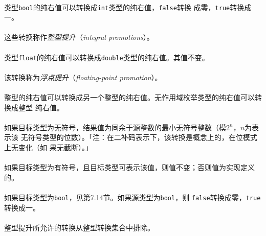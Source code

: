 \paragraph{}
类型\texttt{bool}的纯右值可以转换成\texttt{int}类型的纯右值，\texttt{false}转换
成零，\texttt{true}转换成一。

\paragraph{}
这些转换称作\textit{整型提升}（\textit{integral promotions}）。

\paragraph{}
类型\texttt{float}的纯右值可以转换成\texttt{double}类型的纯右值。其值不变。

\paragraph{}
该转换称为\textit{浮点提升}（\textit{floating-point promotion}）。

\paragraph{}
整型的纯右值可以转换成另一个整型的纯右值。无作用域枚举类型的纯右值可以转换成整型
纯右值。

\paragraph{}
如果目标类型为无符号，结果值为同余于源整数的最小无符号整数（模$2^n$，$n$为表示该
无符号类型的位数）。「注：在二补码表示下，该转换是概念上的，在位模式上无变化（如
果无截断）。」

\paragraph{}
如果目标类型为有符号，且目标类型可表示该值，则值不变；否则值为实现定义的。

\paragraph{}
如果目标类型为\texttt{bool}，见第7.14节。如果源类型为\texttt{bool}，则
\texttt{false}转换成零，\texttt{true}转换成一。

\paragraph{}
整型提升所允许的转换从整型转换集合中排除。

